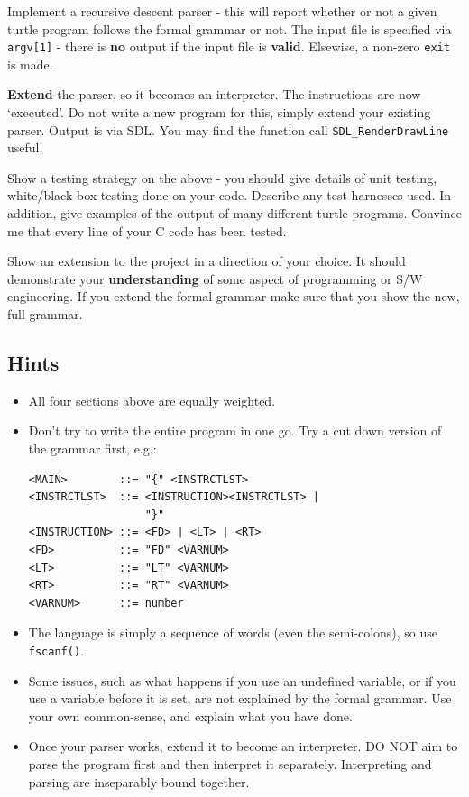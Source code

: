 

\begin{exercise}
Implement a recursive descent parser - this will report
whether or not a given turtle program follows the formal grammar or not.
The input file is specified via \verb^argv[1]^ - there is {\bf no} output if
the input file is {\bf valid}. Elsewise, a non-zero \verb^exit^ is made.

{\bf Extend} the parser, so it becomes an interpreter. The instructions are
now `executed'. Do not write a new program for this, simply extend your
existing parser. Output is via SDL. You may find the function call
\verb^SDL_RenderDrawLine^ useful.

Show a testing strategy on the above -
you should give details of
unit testing, white/black-box testing done on your code. Describe any
test-harnesses used. In addition, give examples of the output of many different
turtle programs. Convince me that every line of your C code
has been tested.

Show an extension to the project in a direction of
your choice. It should demonstrate your {\bf understanding} of some aspect
of programming or S/W engineering. If you extend the formal grammar
make sure that you show the new, full grammar.

\subsection*{Hints}
\begin{itemize}
\item All four sections above are equally weighted.
\item Don't try to write the entire program in one go. Try a cut
down version of the grammar first, e.g.:
{\small
\begin{verbatim}
<MAIN>        ::= "{" <INSTRCTLST>
<INSTRCTLST>  ::= <INSTRUCTION><INSTRCTLST> |
                  "}"
<INSTRUCTION> ::= <FD> | <LT> | <RT>
<FD>          ::= "FD" <VARNUM>
<LT>          ::= "LT" <VARNUM>
<RT>          ::= "RT" <VARNUM>
<VARNUM>      ::= number
\end{verbatim}
}
\item The language is simply a sequence of words (even the semi-colons),
so use \verb^fscanf()^.
\item Some issues, such as what happens if you use an undefined variable,
or if you use a variable before it is set, are not explained by the formal
grammar. Use your own common-sense, and explain what you have done.
\item Once your parser works, extend it to become an interpreter. DO NOT
aim to parse the program first and then interpret it separately. Interpreting
and parsing are inseparably bound together.
\end{itemize}


\end{exercise}
